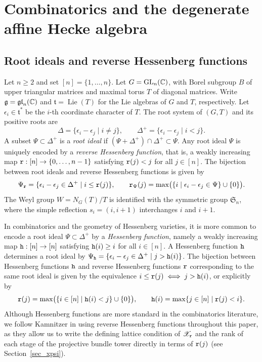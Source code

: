 \section{Combinatorics and the degenerate affine Hecke algebra}\label{sec:deg_hecke}

\subsection{Root ideals and reverse Hessenberg functions}\label{ss:root_ideals_hess_funcs}

Let $n\geq2$ and set $[n]=\{1,\dots,n\}$. Let $G=\mathrm{GL}_n(\mathbb C)$, with Borel subgroup $B$
of upper triangular matrices and maximal torus $T$ of diagonal matrices.
Write $\mathfrak g=\mathfrak{gl}_n(\mathbb C)$ and $\mathfrak t=\operatorname{Lie}(T)$
for the Lie algebras of $G$ and $T$, respectively.
Let $\epsilon_i\in\mathfrak t^*$ be the $i$-th coordinate character of $T$.
The root system of $(G,T)$ and its positive roots are
\[
  \Delta=\{\epsilon_i-\epsilon_j\mid i\neq j\},
  \qquad
  \Delta^+=\{\epsilon_i-\epsilon_j\mid i<j\}.
\]
A subset $\Psi\subset\Delta^+$ is a \emph{root ideal} if
$(\Psi+\Delta^+)\cap\Delta^+\subset\Psi$.
Any root ideal $\Psi$ is uniquely encoded by a
\emph{reverse Hessenberg function}, that is, a weakly increasing map
$\mathtt r:[n]\to\{0,\dots,n-1\}$ satisfying $\mathtt r(j)<j$ for all $j\in[n]$.
The bijection between root ideals and reverse Hessenberg functions is given by
\[
  \Psi_{\mathtt r}
  =\{\epsilon_i-\epsilon_j\in\Delta^+\mid i\leq\mathtt r(j)\},
  \qquad
  \mathtt r_\Psi(j)
  =\max\bigl(\{i\mid\epsilon_i-\epsilon_j\in\Psi\}\cup\{0\}\bigr).
\]
The Weyl group $W=N_G(T)/T$ is identified with the symmetric group $\mathfrak S_n$,
where the simple reflection $s_i=(i,i+1)$ interchanges $i$ and $i+1$.

\begin{remark}\label{rem:hessenberg_comparison}
In combinatorics and the geometry of Hessenberg varieties, it is more common to encode a root ideal $\Psi\subset\Delta^+$ by a \emph{Hessenberg function}, namely a weakly increasing map $\mathtt h:[n]\to[n]$ satisfying $\mathtt h(i)\geq i$ for all $i\in[n]$. A Hessenberg function $\mathtt h$ determines a root ideal by $\Psi_\mathtt h=\{\epsilon_i-\epsilon_j\in\Delta^+\mid j>\mathtt h(i)\}$. The bijection between Hessenberg functions $\mathtt h$ and reverse Hessenberg functions $\mathtt r$ corresponding to the same root ideal is given by the equivalence $i\leq\mathtt r(j)\iff j>\mathtt h(i)$, or explicitly by
\[
  \mathtt r(j)=\max\bigl(\{i\in[n]\mid \mathtt h(i)<j\}\cup\{0\}\bigr),
  \qquad
  \mathtt h(i)=\max\{j\in[n]\mid\mathtt r(j)<i\}.
\]
Although Hessenberg functions are more standard in the combinatorics literature, we follow Kamnitzer \cite[\S2.1]{kamnitzer2024fixed} in using reverse Hessenberg functions throughout this paper, as they allow us to write the defining lattice condition of $\mathscr X_{\mathtt r}$ and the rank of each stage of the projective bundle tower directly in terms of $\mathtt r(j)$ (see Section~\ref{sec_xpsi}).
\end{remark}

